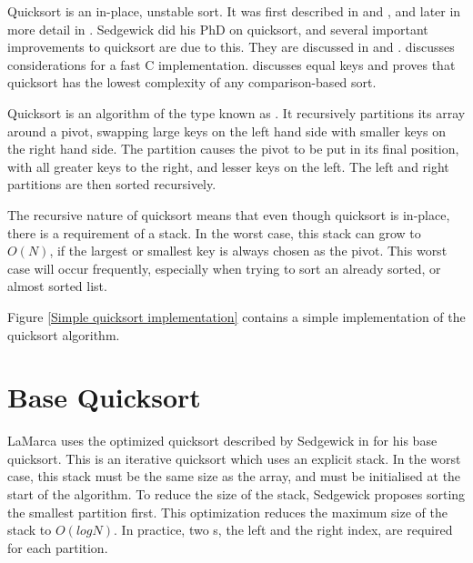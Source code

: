 \label{quick}

Quicksort is an in-place, unstable sort. It was first described in
\cite{HoarePartition61} and \cite{HoareQuicksort61}, and later in more detail in
\cite{Hoare62}. Sedgewick did his PhD on quicksort, and several important
improvements to quicksort are due to this. They are discussed in
\cite{Sedgewick78} and \cite{Sedgewick02}. \cite{BentleyMcIlroy93} discusses
considerations for a fast C implementation. \cite{SedgewickBentley02} discusses
equal keys and proves that quicksort has the lowest complexity of any
comparison-based sort.

Quicksort is an algorithm of the type known as . It
recursively partitions its array around a pivot, swapping large keys on
the left hand side with smaller keys on the right hand side. The partition
causes the pivot to be put in its final position, with all greater keys to the
right, and lesser keys on the left. The left and right partitions are then
sorted recursively.

The recursive nature of quicksort means that even though quicksort is in-place,
there is a requirement of a stack. In the worst case, this stack can grow to
$O(N)$, if the largest or smallest key is always chosen as the pivot. This
worst case will occur frequently, especially when trying to sort an already
sorted, or almost sorted list.

Figure \vref{Simple quicksort implementation} contains a simple implementation of
the quicksort algorithm.


\section{Base Quicksort}

LaMarca uses the optimized quicksort described by Sedgewick in
\cite{Sedgewick02} for his base quicksort. This is an iterative quicksort which
uses an explicit stack. In the worst case, this stack must be the same size as
the array, and must be initialised at the start of the algorithm. To reduce the
size of the stack, Sedgewick proposes sorting the smallest partition first. This
optimization reduces the maximum size of the stack to $O(logN)$. In practice,
two s, the left and the right index, are required for each partition.

